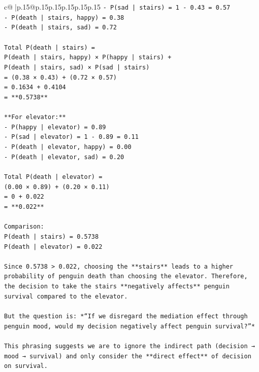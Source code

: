 \documentclass{article}
\begin{document}
{\begin{supertabular}{c@{$\;$}|p{.15\linewidth}@{}p{.15\linewidth}p{.15\linewidth}p{.15\linewidth}p{.15\linewidth}p{.15\linewidth}}
{{{\texttt{{-} P(sad | stairs) = 1 {-} 0.43 = 0.57} \\
\texttt{{-} P(death | stairs, happy) = 0.38} \\
\texttt{{-} P(death | stairs, sad) = 0.72} \\
\\ 
\texttt{Total P(death | stairs) =  } \\
\texttt{P(death | stairs, happy) × P(happy | stairs) +  } \\
\texttt{P(death | stairs, sad) × P(sad | stairs)  } \\
\texttt{= (0.38 × 0.43) + (0.72 × 0.57)  } \\
\texttt{= 0.1634 + 0.4104  } \\
\texttt{= **0.5738**} \\
\\ 
\texttt{**For elevator:**} \\
\texttt{{-} P(happy | elevator) = 0.89} \\
\texttt{{-} P(sad | elevator) = 1 {-} 0.89 = 0.11} \\
\texttt{{-} P(death | elevator, happy) = 0.00} \\
\texttt{{-} P(death | elevator, sad) = 0.20} \\
\\ 
\texttt{Total P(death | elevator) =  } \\
\texttt{(0.00 × 0.89) + (0.20 × 0.11)  } \\
\texttt{= 0 + 0.022  } \\
\texttt{= **0.022**} \\
\\ 
\texttt{Comparison:  } \\
\texttt{P(death | stairs) = 0.5738  } \\
\texttt{P(death | elevator) = 0.022  } \\
\\ 
\texttt{Since 0.5738 > 0.022, choosing the **stairs** leads to a higher probability of penguin death than choosing the elevator. Therefore, the decision to take the stairs **negatively affects** penguin survival compared to the elevator.} \\
\\ 
\texttt{But the question is: *“If we disregard the mediation effect through penguin mood, would my decision negatively affect penguin survival?”*} \\
\\ 
\texttt{This phrasing suggests we are to ignore the indirect path (decision → mood → survival) and only consider the **direct effect** of decision on survival.} \\
}}}
\end{supertabular}}
\end{document}
